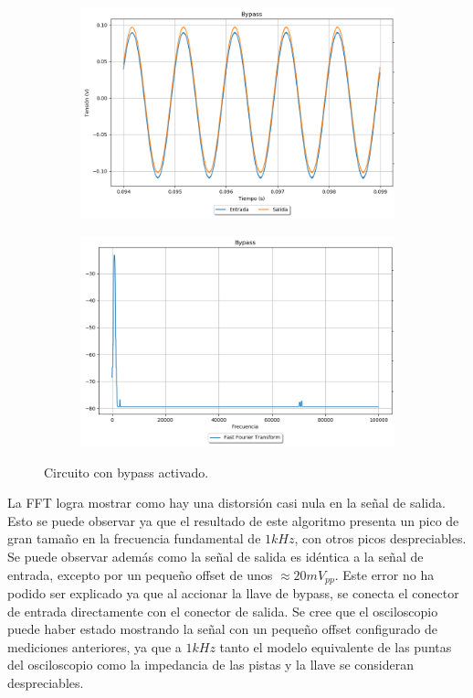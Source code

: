 \begin{figure}[H]
\hspace{-7.5em}
	\begin{subfigure}{0.5\textwidth}
		\includegraphics[width=1.5\textwidth, trim={0 0 0 0}, clip]{Ejercicio5/Imagenes/Propuesto/Mediciones/bypass.png}
		\label{fig:prop_by}
	\end{subfigure}
	\hspace{6em}
	\begin{subfigure}{0.5\textwidth}
		\includegraphics[width=1.5\textwidth, trim={0 0 0 0}, clip]{Ejercicio5/Imagenes/Propuesto/Mediciones/bypassfft.png}
		\centering
		\label{fig:prop_byfft}
	\end{subfigure}
	\caption{Circuito con bypass activado.}
\end{figure}

La FFT logra mostrar como hay una distorsión casi nula en la señal de salida. Esto se puede observar ya que el resultado de este algoritmo presenta un pico de gran tamaño en la frecuencia fundamental de $1kHz$, con otros picos despreciables. Se puede observar además como la señal de salida es idéntica a la señal de entrada, excepto por un pequeño offset de unos $\approx 20mV_{pp}$. Este error no ha podido ser explicado ya que al accionar la llave de bypass, se conecta el conector de entrada directamente con el conector de salida. Se cree que el osciloscopio puede haber estado mostrando la señal con un pequeño offset configurado de mediciones anteriores, ya que a $1kHz$ tanto el modelo equivalente de las puntas del osciloscopio como la impedancia de las pistas y la llave se consideran despreciables.


